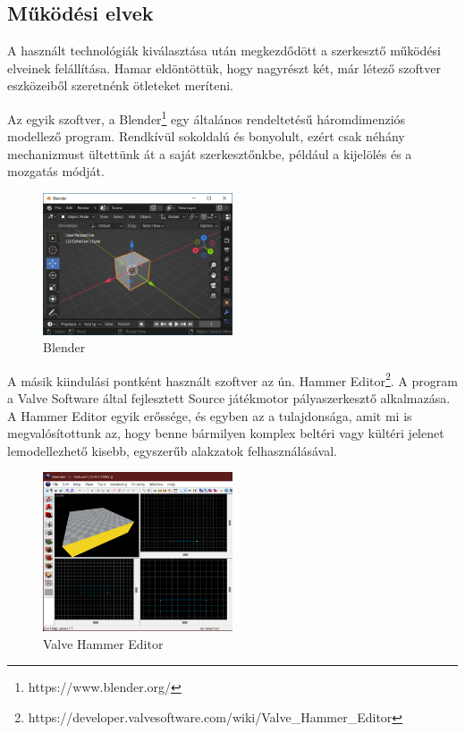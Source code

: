 \subsection{Működési elvek}

A használt technológiák kiválasztása után megkezdődött a szerkesztő működési elveinek felállítása.
Hamar eldöntöttük, hogy nagyrészt két, már létező szoftver eszközeiből szeretnénk ötleteket
meríteni.

Az egyik szoftver, a Blender\footnote{https://www.blender.org/} egy általános rendeltetésű
háromdimenziós modellező program. Rendkívül sokoldalú és bonyolult, ezért csak néhány mechanizmust
ültettünk át a saját szerkesztőnkbe, például a kijelölés és a mozgatás módját.

\begin{figure}[h]
      \centering
      \includegraphics[width=0.5\textwidth]{parts/developer-documentation/editor/images/blender.png}
      \caption{Blender}
\end{figure}

A másik kiindulási pontként használt szoftver az ún.
Hammer Editor\footnote{https://developer.valvesoftware.com/wiki/Valve\_Hammer\_Editor}. A program a
Valve Software által fejlesztett Source játékmotor pályaszerkesztő alkalmazása. A Hammer Editor
egyik erőssége, és egyben az a tulajdonsága, amit mi is megvalósítottunk az, hogy benne bármilyen
komplex beltéri vagy kültéri jelenet lemodellezhető kisebb, egyszerűb alakzatok felhasználásával.

\begin{figure}[h]
      \centering
      \includegraphics[width=0.5\textwidth]{parts/developer-documentation/editor/images/hammer.png}
      \caption{Valve Hammer Editor}
\end{figure}


